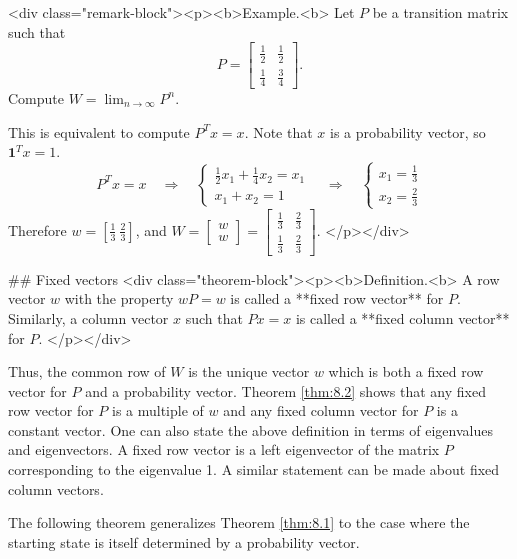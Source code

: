 <div class="remark-block"><p><b>Example.<b> 
Let $P$ be a transition matrix such that 
$$\begin{equation}
    P = \begin{bmatrix}  \frac{1}{2} & \frac{1}{2} \\ \frac{1}{4} & \frac{3}{4} \end{bmatrix}.
\end{equation}$$
Compute $W = \lim_{n\to\infty} P^n$. 

This is equivalent to compute $P^T x = x$. Note that $x$ is a probability vector, so $\mathbf{1}^T x = 1$.
$$\begin{equation}
    P^T x = x \quad \Rightarrow \quad \begin{cases} \frac{1}{2} x_1 + \frac{1}{4}x_2 = x_1 \\ x_1+x_2 = 1 \end{cases} \quad \Rightarrow \quad
    \begin{cases} x_1 = \frac{1}{3} \\ x_2 = \frac{2}{3} \end{cases}
\end{equation}$$
Therefore $w = [\frac{1}{3} \ \frac{2}{3}]$, and $W = \begin{bmatrix} w \\ w \end{bmatrix} = \begin{bmatrix} \frac{1}{3} & \frac{2}{3} \\ \frac{1}{3} & \frac{2}{3} \end{bmatrix}$.
</p></div>

## Fixed vectors
<div class="theorem-block"><p><b>Definition.<b> 
A row vector $w$ with the property $wP = w$ is called a **fixed row vector** for $P$. Similarly, a column vector $x$ such that $Px = x$ is called a **fixed column vector** for $P$.
</p></div>

Thus, the common row of $W$ is the unique vector $w$ which is both a fixed row vector for $P$ and a probability vector. Theorem \ref{thm:8.2} shows that any fixed row vector for $P$ is a multiple of $w$ and any fixed column vector for $P$ is a constant vector. One can also state the above definition in terms of eigenvalues and eigenvectors. A fixed row vector is a left eigenvector of the matrix $P$ corresponding to the eigenvalue 1. A similar statement can be made about fixed column vectors.

The following theorem generalizes Theorem \ref{thm:8.1} to the case where the starting state is itself
determined by a probability vector.

